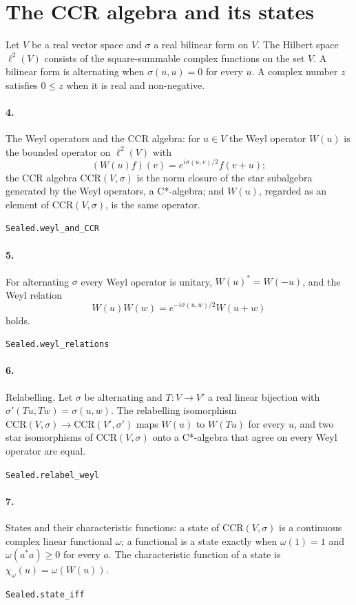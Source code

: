 \documentclass[11pt]{article}
\begin{document}
\section*{The CCR algebra and its states}
Let $V$ be a real vector space and $\sigma$ a real bilinear form on $V$. The Hilbert space $\ell^2(V)$ consists of the square-summable complex functions on the set $V$. A bilinear form is alternating when $\sigma(u, u) = 0$ for every $u$. A complex number $z$ satisfies $0 \le z$ when it is real and non-negative.

\paragraph{4.} The Weyl operators and the CCR algebra: for $u \in V$ the Weyl operator $W(u)$ is the bounded operator on $\ell^2(V)$ with \[(W(u) f)(v) = e^{i\sigma(u, v)/2} f(v + u);\] the CCR algebra $\mathrm{CCR}(V, \sigma)$ is the norm closure of the star subalgebra generated by the Weyl operators, a C*-algebra; and $W(u)$, regarded as an element of $\mathrm{CCR}(V, \sigma)$, is the same operator.\par{\footnotesize\texttt{Sealed.weyl\_and\_CCR}}

\paragraph{5.} For alternating $\sigma$ every Weyl operator is unitary, $W(u)^* = W(-u)$, and the Weyl relation \[W(u) W(w) = e^{-i\sigma(u, w)/2} W(u + w)\] holds.\par{\footnotesize\texttt{Sealed.weyl\_relations}}

\paragraph{6.} Relabelling. Let $\sigma$ be alternating and $T : V \to V'$ a real linear bijection with $\sigma'(T u, T w) = \sigma(u, w)$. The relabelling isomorphism $\mathrm{CCR}(V, \sigma) \to \mathrm{CCR}(V', \sigma')$ maps $W(u)$ to $W(T u)$ for every $u$, and two star isomorphisms of $\mathrm{CCR}(V, \sigma)$ onto a C*-algebra that agree on every Weyl operator are equal.\par{\footnotesize\texttt{Sealed.relabel\_weyl}}

\paragraph{7.} States and their characteristic functions: a state of $\mathrm{CCR}(V, \sigma)$ is a continuous complex linear functional $\omega$; a functional is a state exactly when $\omega(1) = 1$ and $\omega(a^* a) \ge 0$ for every $a$. The characteristic function of a state is $\chi_\omega(u) = \omega(W(u))$.\par{\footnotesize\texttt{Sealed.state\_iff}}
\end{document}
